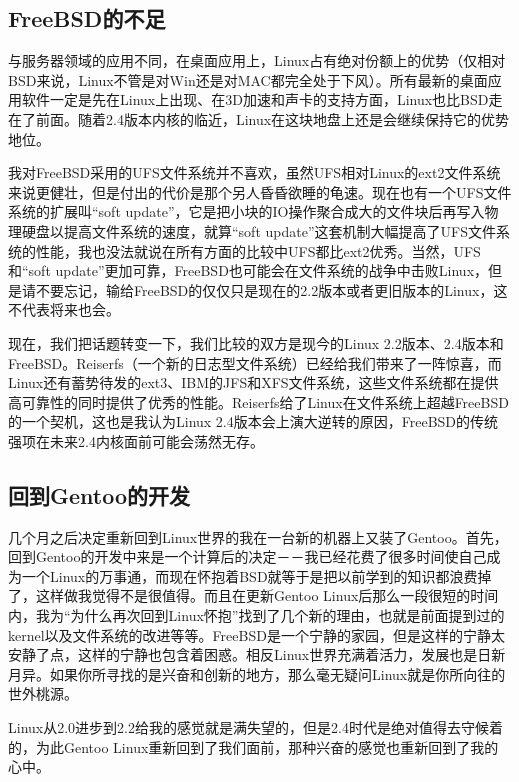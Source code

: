 \subsection{FreeBSD的不足}

与服务器领域的应用不同，在桌面应用上，Linux占有绝对份额上的优势（仅相对BSD来说，Linux不管是对Win还是对MAC都完全处于下风）。所有最新的桌面应用软件一定是先在Linux上出现、在3D加速和声卡的支持方面，Linux也比BSD走在了前面。随着2.4版本内核的临近，Linux在这块地盘上还是会继续保持它的优势地位。

我对FreeBSD采用的UFS文件系统并不喜欢，虽然UFS相对Linux的ext2文件系统来说更健壮，但是付出的代价是那个另人昏昏欲睡的龟速。现在也有一个UFS文件系统的扩展叫“soft update”，它是把小块的IO操作聚合成大的文件块后再写入物理硬盘以提高文件系统的速度，就算“soft update”这套机制大幅提高了UFS文件系统的性能，我也没法就说在所有方面的比较中UFS都比ext2优秀。当然，UFS和“soft update”更加可靠，FreeBSD也可能会在文件系统的战争中击败Linux，但是请不要忘记，输给FreeBSD的仅仅只是现在的2.2版本或者更旧版本的Linux，这不代表将来也会。

现在，我们把话题转变一下，我们比较的双方是现今的Linux 2.2版本、2.4版本和FreeBSD。Reiserfs（一个新的日志型文件系统）已经给我们带来了一阵惊喜，而Linux还有蓄势待发的ext3、IBM的JFS和XFS文件系统，这些文件系统都在提供高可靠性的同时提供了优秀的性能。Reiserfs给了Linux在文件系统上超越FreeBSD的一个契机，这也是我认为Linux 2.4版本会上演大逆转的原因，FreeBSD的传统强项在未来2.4内核面前可能会荡然无存。

\subsection{回到Gentoo的开发}

几个月之后决定重新回到Linux世界的我在一台新的机器上又装了Gentoo。首先，回到Gentoo的开发中来是一个计算后的决定－－我已经花费了很多时间使自己成为一个Linux的万事通，而现在怀抱着BSD就等于是把以前学到的知识都浪费掉了，这样做我觉得不是很值得。而且在更新Gentoo Linux后那么一段很短的时间内，我为“为什么再次回到Linux怀抱”找到了几个新的理由，也就是前面提到过的kernel以及文件系统的改进等等。FreeBSD是一个宁静的家园，但是这样的宁静太安静了点，这样的宁静也包含着困惑。相反Linux世界充满着活力，发展也是日新月异。如果你所寻找的是兴奋和创新的地方，那么毫无疑问Linux就是你所向往的世外桃源。

Linux从2.0进步到2.2给我的感觉就是满失望的，但是2.4时代是绝对值得去守候着的，为此Gentoo Linux重新回到了我们面前，那种兴奋的感觉也重新回到了我的心中。

